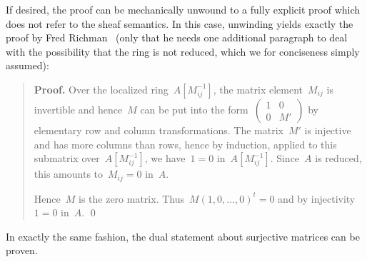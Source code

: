 \documentclass{ws-rv9x6}
\begin{document}
{If desired, the proof can be mechanically unwound to a fully explicit proof
which does not refer to the sheaf semantics. In this case, unwinding yields
exactly the proof by Fred Richman~\cite[Theorem~2]{richman:trivial-rings} (only
that he needs one additional paragraph to deal with the possibility that the
ring is not reduced, which we for conciseness simply assumed):

\begin{quote}
\textbf{Proof.} Over the localized
ring~$A[M_{ij}^{-1}]$, the matrix element~$M_{ij}$ is invertible and hence~$M$ can be
put into the form~$\left(\begin{smallmatrix}1&0\\0&M'\end{smallmatrix}\right)$
by elementary row and column transformations. The matrix~$M'$ is injective and
has more columns than rows, hence by induction, applied to this submatrix
over~$A[M_{ij}^{-1}]$, we have~$1 = 0$ in~$A[M_{ij}^{-1}]$. Since~$A$ is
reduced, this amounts to~$M_{ij} = 0$ in~$A$.

Hence~$M$ is the zero matrix. Thus~$M(1,0,\ldots,0)^t = 0$ and by
injectivity~$1 = 0$ in~$A$. \qed
\end{quote}

In exactly the same fashion, the dual statement about surjective matrices can
be proven.

}
\end{document}
